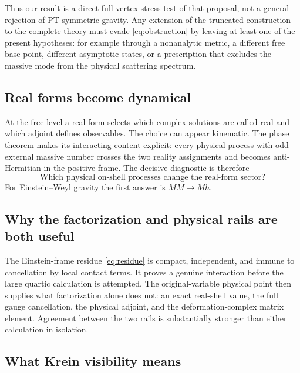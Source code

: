 \documentclass[11pt]{article}
\theoremstyle{definition}
\theoremstyle{remark}
\begin{document}
Thus our result is a direct full-vertex stress test of that proposal, not
a general rejection of PT-symmetric gravity.  Any extension of the
truncated construction to the complete theory must evade
\eqref{eq:obstruction} by leaving at least one of the present hypotheses:
for example through a nonanalytic metric, a different free base point,
different asymptotic states, or a prescription that excludes the massive
mode from the physical scattering spectrum.

\subsection{Real forms become dynamical}

At the free level a real form selects which complex solutions are called
real and which adjoint defines observables.  The choice can appear
kinematic.  The phase theorem makes its interacting content explicit:
every physical process with odd external massive number crosses the two
reality assignments and becomes anti-Hermitian in the positive frame.
The decisive diagnostic is therefore
\begin{equation}
\boxed{\text{Which physical on-shell processes change the real-form
sector?}}
\end{equation}
For Einstein--Weyl gravity the first answer is $MM\to Mh$.

\subsection{Why the factorization and physical rails are both useful}

The Einstein-frame residue \eqref{eq:residue} is compact, independent,
and immune to cancellation by local contact terms.  It proves a genuine
interaction before the large quartic calculation is attempted.  The
original-variable physical point then supplies what factorization alone
does not: an exact real-shell value, the full gauge cancellation, the
physical adjoint, and the deformation-complex matrix element.  Agreement
between the two rails is substantially stronger than either calculation
in isolation.

\subsection{What Krein visibility means}
\end{document}
